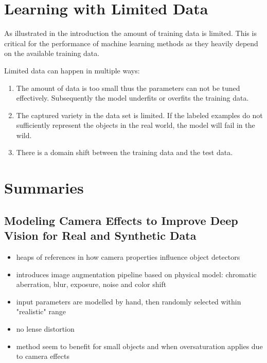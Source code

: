 \section{Learning with Limited Data}
\label{sec:bg:training}

As illustrated in the introduction the amount of training data is limited. This is critical for the performance of machine learning methods as they heavily depend on the available training data.

Limited data can happen in multiple ways:
\begin{enumerate}
	\item The amount of data is too small thus the parameters can not be tuned effectively. Subsequently the model underfits or overfits the training data.
	
	\item The captured variety in the data set is limited. If the labeled examples do not sufficiently represent the objects in the real world, the model will fail in the wild.
	
	\item There is a domain shift between the training data and the test data.
\end{enumerate}


\section{Summaries}
\subsection{Modeling Camera Effects to Improve Deep Vision for Real and Synthetic Data\cite{Carlson2018}}
\begin{itemize}
	\item heaps of references in how camera properties influence object detectors
	\item introduces image augmentation pipeline based on physical model: chromatic aberration, blur, exposure, noise and color shift
	\item input parameters are modelled by hand, then randomly selected within "realistic" range
	\item no lense distortion
	\item method seem to benefit for small objects and when oversaturation applies due to camera effects
\end{itemize}
